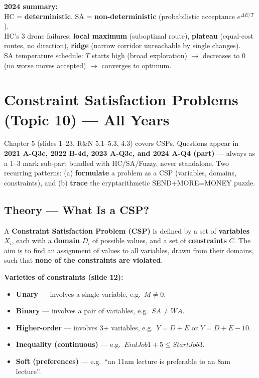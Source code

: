 \documentclass[12pt, a4paper]{article}
\newenvironment{solutionbox}{\begin{mdframed}[style=solutionframe]}{\end{mdframed}}
\newenvironment{answerbox}{\begin{mdframed}[style=answerframe]}{\end{mdframed}}
\begin{document}
\begin{answerbox}
\textbf{2024 summary:}\\
HC = \textbf{deterministic}. SA = \textbf{non-deterministic} (probabilistic acceptance $e^{\Delta E/T}$).\\
HC's 3 drone failures: \textbf{local maximum} (suboptimal route), \textbf{plateau} (equal-cost routes, no direction), \textbf{ridge} (narrow corridor unreachable by single changes).\\
SA temperature schedule: $T$ starts high (broad exploration) $\to$ decreases to 0 (no worse moves accepted) $\to$ converges to optimum.
\end{answerbox}

\section{Constraint Satisfaction Problems (Topic 10) — All Years}

\noindent Chapter 5 (slides 1--23, R\&N 5.1--5.3, 4.3) covers CSPs. Questions appear in \textbf{2021 A-Q3c, 2022 B-4d, 2023 A-Q3c, and 2024 A-Q4 (part)} — always as a 1--3 mark sub-part bundled with HC/SA/Fuzzy, never standalone. Two recurring patterns: (a) \textbf{formulate} a problem as a CSP (variables, domains, constraints), and (b) \textbf{trace} the cryptarithmetic SEND+MORE=MONEY puzzle.

\subsection{Theory — What Is a CSP?}

\begin{solutionbox}
A \textbf{Constraint Satisfaction Problem (CSP)} is defined by a set of \textbf{variables} $X_i$, each with a \textbf{domain} $D_i$ of possible values, and a set of \textbf{constraints} $C$. The aim is to find an assignment of values to all variables, drawn from their domains, such that \textbf{none of the constraints are violated}.
\end{solutionbox}

\vspace{0.4em}

\noindent\textbf{Varieties of constraints (slide 12):}
\begin{itemize}[noitemsep]
  \item \textbf{Unary} — involves a single variable, e.g.\ $M \neq 0$.
  \item \textbf{Binary} — involves a pair of variables, e.g.\ $SA \neq WA$.
  \item \textbf{Higher-order} — involves 3+ variables, e.g.\ $Y = D + E$ or $Y = D + E - 10$.
  \item \textbf{Inequality (continuous)} — e.g.\ $\mathit{EndJob1} + 5 \leq \mathit{StartJob3}$.
  \item \textbf{Soft (preferences)} — e.g.\ ``an 11am lecture is preferable to an 8am lecture''.
\end{itemize}
\end{document}
